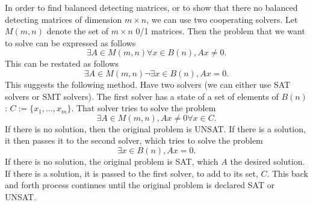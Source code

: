 \documentclass{article}
\begin{document}
In order to find balanced detecting matrices, or to show that there no
balanced detecting matrices of dimension $m \times n$, we can use two
cooperating solvers.  Let $M(m,n)$ denote the set of $m \times n$ 0/1
matrices.  Then the problem that we want to solve can be expressed as
follows
\begin{equation}
  \label{eq:logical}
  \exists A \in M(m,n) \forall x \in B(n), Ax \ne 0.
\end{equation}
This can be restated as follows
\begin{equation}
  \label{eq:logical:restate}
  \exists A \in M(m,n) \neg \exists x \in B(n), Ax = 0.
\end{equation}
This suggests the following method.  Have two solvers (we can either
use SAT solvers or SMT solvers).  The first solver has a state of a
set of elements of $B(n)$: $C:=\{x_1, \dots, x_m\}$.  That solver tries
to solve the problem
\begin{displaymath}
  \exists A \in M(m,n), Ax \ne 0 \forall x \in C.
\end{displaymath}
If there is no solution, then the original problem is UNSAT.  If there
is a solution, it then passes it to the second solver, which tries to
solve the problem
\begin{displaymath}
  \exists x \in B(n), A x = 0.
\end{displaymath}
If there is no solution, the original problem is SAT, which $A$ the
desired solution.  If there is a solution, it is passed to the first
solver, to add to its set, $C$.  This back and forth process continues
until the original problem is declared SAT or UNSAT.
\end{document}
